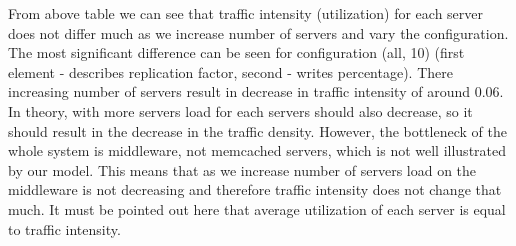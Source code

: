 \documentclass[11pt]{article}
\newcommand{\rowstyle}[1]{\gdef\currentrowstyle{#1}%
  #1\ignorespaces
}
\begin{document}
{\small
\begin{center}
\end{center}
}

From above table we can see that traffic intensity (utilization) for each server does not differ much as we increase number of servers and vary the configuration. The most significant difference can be seen for configuration (all, 10) (first element - describes replication factor, second - writes percentage). There increasing number of servers result in decrease in traffic intensity of around 0.06. In theory, 
with more servers load for each servers should also decrease, so it should result in the decrease in the traffic density. However, the bottleneck of the whole system is middleware, not memcached servers, which is not well illustrated by our model. This means that as we increase number of servers load on the middleware is not decreasing and therefore traffic intensity does not change that much. It must be pointed out here that average utilization of each server is equal to traffic intensity. 
\end{document}
